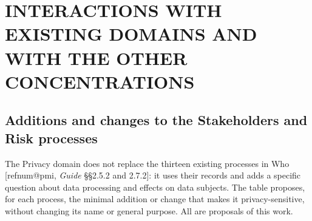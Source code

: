 \documentclass[12pt,a4paper,article,oneside,brazil,english]{abntex2}
\makeatletter
\newcommand{\refnum}[1]{\csname refnum@#1\endcsname}
\makeatother
\begin{document}
\section{INTERACTIONS WITH EXISTING DOMAINS AND WITH THE OTHER CONCENTRATIONS}
\subsection{Additions and changes to the Stakeholders and Risk processes}

The Privacy domain does not replace the thirteen existing processes in Who [\refnum{pmi}, \textit{Guide} §§2.5.2 and 2.7.2]: it uses their records and adds a specific question about data processing and effects on data subjects. The table proposes, for each process, the minimal addition or change that makes it privacy-sensitive, without changing its name or general purpose. All are proposals of this work.
\end{document}
